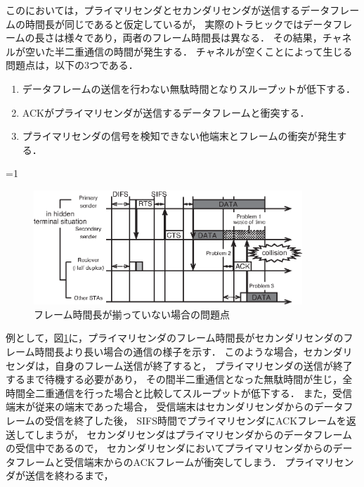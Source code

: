 \documentclass[master]{kuisthesis}		%
\newcounter{flagFig}
\begin{document}
			\par
			この\cite{fdmac}においては，プライマリセンダとセカンダリセンダが送信するデータフレームの時間長が同じであると仮定しているが，
			実際のトラヒックではデータフレームの長さは様々であり，両者のフレーム時間長は異なる．
			その結果，チャネルが空いた半二重通信の時間が発生する．
			チャネルが空くことによって生じる問題点は，以下の3つである．
			\begin{enumerate}
				\item データフレームの送信を行わない無駄時間となりスループットが低下する．
			 	\item ACKがプライマリセンダが送信するデータフレームと衝突する．
			 	\item プライマリセンダの信号を検知できない他端末とフレームの衝突が発生する．
			\end{enumerate}
			\par
			\ifnum\value{flagFig}=1 {\begin{figure}[t]
				\begin{center}
					\includegraphics[width=0.9\textwidth]{fig/relay_not_equal2.eps}
					\caption{フレーム時間長が揃っていない場合の問題点}
					\label{fig:not_equal}
				\end{center}
			\end{figure}}\fi
			例として，図\ref{fig:not_equal}に，プライマリセンダのフレーム時間長がセカンダリセンダのフレーム時間長より長い場合の通信の様子を示す．
			このような場合，セカンダリセンダは，自身のフレーム送信が終了すると，
			プライマリセンダの送信が終了するまで待機する必要があり，
			その間半二重通信となった無駄時間が生じ，全時間全二重通信を行った場合と比較してスループットが低下する．
			また，受信端末が従来の端末であった場合，
			受信端末はセカンダリセンダからのデータフレームの受信を終了した後，
			SIFS時間でプライマリセンダにACKフレームを返送してしまうが，
			セカンダリセンダはプライマリセンダからのデータフレームの受信中であるので，
			セカンダリセンダにおいてプライマリセンダからのデータフレームと受信端末からのACKフレームが衝突してしまう．
			プライマリセンダが送信を終わるまで，
\end{document}
